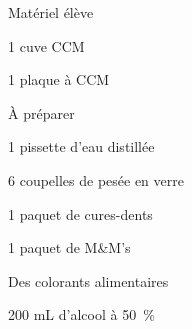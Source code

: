 
\begin{boiteMateriel}{Matériel élève}
  \effectifSeconde
  
  \begin{protocole}[2]
    \item 1 cuve CCM %
    \item 1 plaque à CCM
  \end{protocole}
\end{boiteMateriel}


\begin{boiteMateriel}{À préparer}
  \begin{protocole}
    \item 1 pissette d'eau distillée
    \item 6 coupelles de pesée en verre
    \item 1 paquet de cures-dents
    \item 1 paquet de M\&M's
    \item Des colorants alimentaires
    \item 200 mL d'alcool à \qty{50}{\percent}
  \end{protocole}
\end{boiteMateriel}